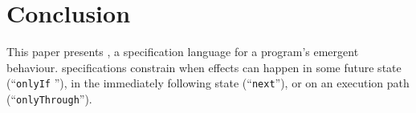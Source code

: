 \section{Conclusion}
\label{s:conclusion}




This paper presents 
\Nec, a specification language for a program's
emergent behaviour.
\Nec specifications
constrain when effects can happen in some future state
(``\texttt{\color{blue}onlyIf} ''),
in the immediately following state (``\texttt{\color{blue}next}''), or
on an execution path 
(``\texttt{\color{blue}onlyThrough}'').


 
